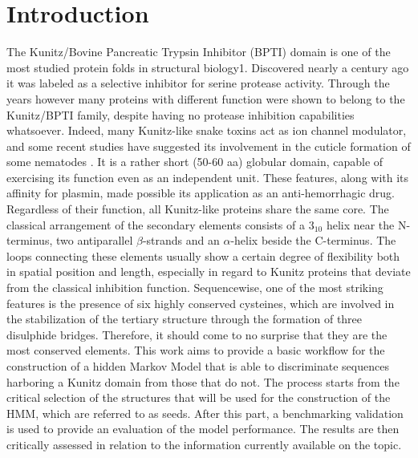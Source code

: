 \documentclass[nocrop]{bioinfo}
\begin{document}
\section{Introduction}
The Kunitz/Bovine Pancreatic Trypsin Inhibitor (BPTI) domain is one of the most studied protein folds in structural biology1.
Discovered nearly a century ago \citep{krautUberInaktivierungKallikreins1930, kunitzISOLATIONBEEFPANCREAS1936} it was labeled as a selective inhibitor for serine protease activity.
Through the years however many proteins with different function were shown to belong to the Kunitz/BPTI family, despite having no protease inhibition capabilities whatsoever.
Indeed, many Kunitz-like snake toxins act as ion channel modulator, and some recent studies have suggested its involvement in the cuticle formation of some nematodes \citep{pageBiosynthesisEnzymologyCaenorhabditis2006, stepekKunitzDomainProtein2010}.
It is a rather short (50-60 aa) globular domain, capable of exercising its function even as an independent unit.
These features, along with its affinity for plasmin, made possible its application as an anti-hemorrhagic drug.
Regardless of their function, all Kunitz-like proteins share the same core.
The classical arrangement of the secondary elements consists of a $3_{10}$ helix near the N-terminus, two antiparallel $\beta$-strands and an $\alpha$-helix beside the C-terminus.
The loops connecting these elements usually show a certain degree of flexibility both in spatial position and length, especially in regard to Kunitz proteins that deviate from the classical inhibition function.
Sequencewise, one of the most striking features is the presence of six highly conserved cysteines, which are involved in the stabilization of the tertiary structure through the formation of three disulphide bridges.
Therefore, it should come to no surprise that they are the most conserved elements.
This work aims to provide a basic workflow for the construction of a hidden Markov Model that is able to discriminate sequences harboring a Kunitz domain from those that do not.
The process starts from the critical selection of the structures that will be used for the construction of the HMM, which are referred to as seeds.
After this part, a benchmarking validation is used to provide an evaluation of the model performance.
The results are then critically assessed in relation to the information currently available on the topic.
 
\end{document}
